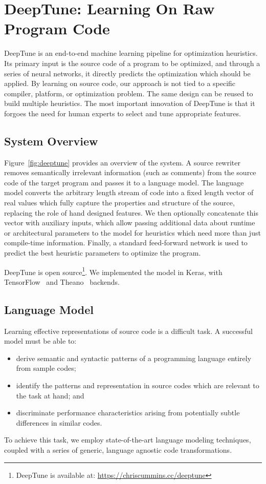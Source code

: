 \section{DeepTune: Learning On Raw Program Code} \label{sec:DeepTune}



DeepTune is an end-to-end machine learning pipeline for optimization heuristics. Its primary input is the source code of a program to be optimized, and through a series of neural networks, it directly predicts the optimization which should be applied. By learning on source code, our approach is not tied to a specific compiler, platform, or optimization problem. The same design can be reused to build multiple heuristics. The most important innovation of DeepTune is that it forgoes the need for human experts to select and tune appropriate features.


\subsection{System Overview}

Figure~\ref{fig:deeptune} provides an overview of the system. A source rewriter removes semantically irrelevant information (such as comments) from the source code of the target program and passes it to a language model. The language model converts the arbitrary length stream of code into a fixed length vector of real values which fully capture the properties and structure of the source, replacing the role of hand designed features. We then optionally concatenate this vector with auxiliary inputs, which allow passing additional data about runtime or architectural parameters to the model for heuristics which need more than just compile-time information. Finally, a standard feed-forward network is used to predict the best heuristic parameters to optimize the program.

DeepTune is open source\footnote{DeepTune is available at: \url{https://chriscummins.cc/deeptune}}. We implemented the model in Keras, with TensorFlow~\cite{Abadi} and Theano~\cite{Bergstra2011} backends.


\subsection{Language Model}

Learning effective representations of source code is a difficult task. A successful model must be able to:
%
\begin{itemize}
  \item derive semantic and syntactic patterns of a programming language entirely from sample codes;
  \item identify the patterns and representation in source codes which are relevant to the task at hand; and
  \item discriminate performance characteristics arising from potentially subtle differences in similar codes.
\end{itemize}
%
To achieve this task, we employ state-of-the-art language modeling techniques, coupled with a series of generic, language agnostic code transformations.

